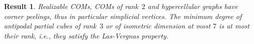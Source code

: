 \documentclass[final,11pt]{article}
\newtheorem{thmintro}{Result}%
\begin{document}
\begin{thmintro}
Realizable COMs, COMs of rank~$2$ and hypercellular graphs have corner peelings, thus in particular simplicial vertices. The minimum degree of antipodal partial cubes of rank~$3$ or of isometric dimension at most $7$ is at most their rank, i.e., they satisfy the Las-Vergnas property. 
\end{thmintro}




% 
% 
% 
% 
\end{document}
